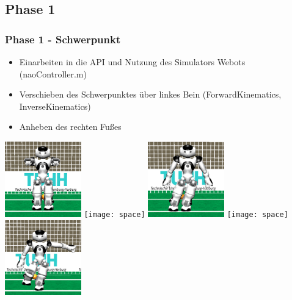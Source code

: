 \documentclass[]{beamer}
\begin{document}
\subsection{Phase 1}
\begin{frame}
	\frametitle{Phase 1 - Schwerpunkt}
	\begin{itemize}
		\item Einarbeiten in die API und Nutzung des Simulators Webots (naoController.m)
		\item Verschieben des Schwerpunktes über linkes Bein (ForwardKinematics, InverseKinematics)
		\item Anheben des rechten Fußes	
	\end{itemize}
	\includegraphics[width=3.3cm]{nao1}
	\texttt{[image: space]}
	\includegraphics[width=3.3cm]{nao2}
	\texttt{[image: space]}
	\includegraphics[width=3.3cm]{nao3}
\end{frame}
\end{document}
